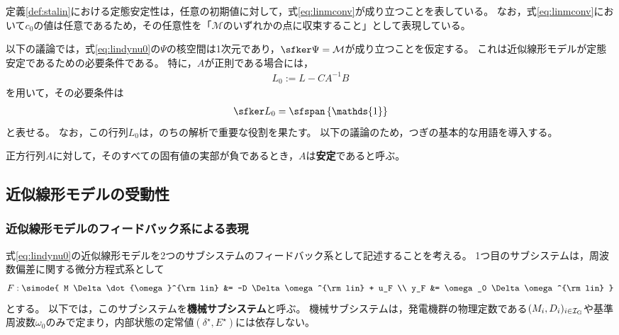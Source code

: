 \documentclass[tombow,dvipdfmx]{corona-a5-1.1}
\begin{document}
定義\ref{def:stalin}における定態安定性は，任意の初期値に対して，式\ref{eq:linmconv}が成り立つことを表している。
なお，式\ref{eq:linmconv}において$c_0$の値は任意であるため，その任意性を「$\mathcal{M}$のいずれかの点に収束すること」として表現している。

以下の議論では，式\ref{eq:lindynu0}の$\Psi$の核空間は1次元であり，$\sfker \Psi = \mathcal{M}$が成り立つことを仮定する。
これは近似線形モデルが定態安定であるための必要条件である。
特に，$A$が正則である場合には，
\begin{align}\label{eq:defL0}
L_0:= L-CA^{-1}B 
\end{align}
を用いて，その必要条件は
\begin{align}\label{eq:nescon}
\sfker L_0 = \sfspan
\left\{
\mathds{1}
\right\}
\end{align}
と表せる。
なお，この行列$L_0$は，のちの解析で重要な役割を果たす。
以下の議論のため，つぎの基本的な用語を導入する。

\begin{定義}[正方行列の安定性]
\label{def:matsta}
正方行列$A$に対して，そのすべての固有値の実部が負であるとき，$A$は\textbf{安定}であると呼ぶ。
\end{定義}



\subsection{近似線形モデルの受動性\advanced}\label{sec:linpasana}

\subsubsection{近似線形モデルのフィードバック系による表現}

式\ref{eq:lindynu0}の近似線形モデルを2つのサブシステムのフィードバック系として記述することを考える。
1つ目のサブシステムは，周波数偏差に関する微分方程式系として
\begin{align}\label{eq:Fss}
F: \simode{
M \Delta \dot{\omega}^{\rm lin} &= -D \Delta \omega^{\rm lin}
+
u_F \\
y_F &= \omega_0 \Delta \omega^{\rm lin}
}
\end{align}
とする。
以下では，このサブシステムを\textbf{機械サブシステム}と呼ぶ。
機械サブシステムは，発電機群の物理定数である$(M_i,D_i)_{i\in \mathcal{I}_{\rm G}}$や基準周波数$\omega_0$のみで定まり，内部状態の定常値$(\delta^{\star},E^{\star})$には依存しない。
\end{document}
